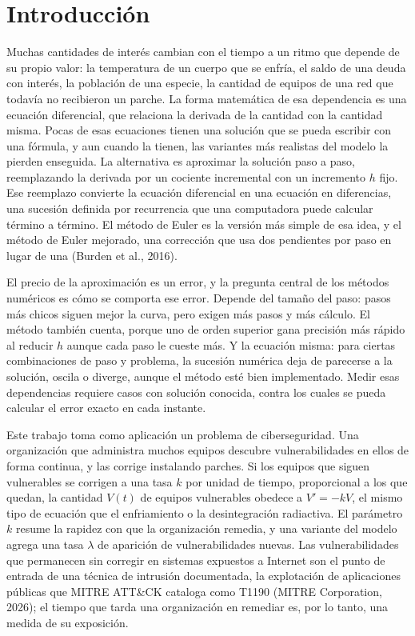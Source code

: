 \section{Introducción}
\label{sec:introduccion}

Muchas cantidades de interés cambian con el tiempo a un ritmo que depende de su propio valor: la
temperatura de un cuerpo que se enfría, el saldo de una deuda con interés, la población de una
especie, la cantidad de equipos de una red que todavía no recibieron un parche. La forma
matemática de esa dependencia es una ecuación diferencial, que relaciona la derivada de la
cantidad con la cantidad misma. Pocas de esas ecuaciones tienen una solución que se pueda
escribir con una fórmula, y aun cuando la tienen, las variantes más realistas del modelo la
pierden enseguida. La alternativa es aproximar la solución paso a paso, reemplazando la derivada
por un cociente incremental con un incremento $h$ fijo. Ese reemplazo convierte la ecuación
diferencial en una ecuación en diferencias, una sucesión definida por recurrencia que una
computadora puede calcular término a término. El método de Euler es la versión más simple de esa
idea, y el método de Euler mejorado, una corrección que usa dos pendientes por paso en lugar de
una (Burden et al., 2016).

El precio de la aproximación es un error, y la pregunta central de los métodos numéricos es cómo
se comporta ese error. Depende del tamaño del paso: pasos más chicos siguen mejor la curva, pero
exigen más pasos y más cálculo. El método también cuenta, porque uno de orden superior gana
precisión más rápido al reducir $h$ aunque cada paso le cueste más. Y la ecuación misma: para
ciertas combinaciones de paso y problema, la sucesión numérica deja de parecerse a la solución,
oscila o diverge, aunque el método esté bien implementado. Medir esas dependencias requiere casos con
solución conocida, contra los cuales se pueda calcular el error exacto en cada instante.

Este trabajo toma como aplicación un problema de ciberseguridad. Una organización que administra
muchos equipos descubre vulnerabilidades en ellos de forma continua, y las corrige instalando
parches. Si los equipos que siguen vulnerables se corrigen a una tasa $k$ por unidad de tiempo,
proporcional a los que quedan, la cantidad $V(t)$ de equipos vulnerables obedece a $V' = -kV$,
el mismo tipo de
ecuación que el enfriamiento o la desintegración radiactiva. El parámetro $k$ resume la
rapidez con que la organización remedia, y una variante del modelo agrega una tasa $\lambda$ de
aparición de vulnerabilidades nuevas. Las vulnerabilidades que permanecen sin corregir en
sistemas expuestos a Internet son el punto de entrada de una técnica de intrusión documentada,
la explotación de aplicaciones públicas que MITRE ATT\&CK cataloga como T1190
(MITRE Corporation, 2026); el tiempo que tarda una organización en remediar es, por lo tanto,
una medida de su exposición.

